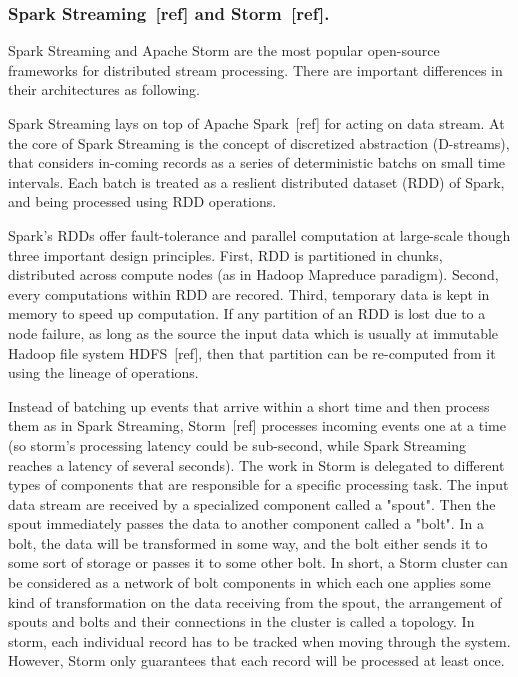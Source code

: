 \documentclass{acm_proc_article-sp}
\begin{document}
\subsubsection{Spark Streaming~[ref] and Storm~[ref].}

Spark Streaming and Apache Storm are the most popular open-source frameworks for distributed stream processing. There are important differences in their architectures as following.

Spark Streaming lays on top of Apache Spark~[ref] for acting on data stream.
 At the core of Spark Streaming is the concept of discretized abstraction (D-streams), that considers in-coming records as a series of deterministic batchs on small time intervals. Each batch is treated as a reslient distributed dataset (RDD) of Spark, and being processed using RDD operations. 

 Spark's RDDs offer fault-tolerance and parallel computation at large-scale though three important design principles. First, RDD is partitioned in chunks, distributed across compute nodes (as in Hadoop Mapreduce paradigm). Second, every computations within RDD are recored. Third, temporary data is kept in memory to speed up computation. If any partition of an RDD is lost due to a node failure, as long as the source the input data which is usually at immutable Hadoop file system HDFS~[ref], then that partition can be re-computed from it using the lineage of operations.

Instead of batching up events that arrive within a short time and then process them as in Spark Streaming, Storm~[ref] processes incoming events one at a time (so storm’s processing latency could be sub-second, while Spark Streaming reaches a latency of several seconds). The work in Storm is delegated to different types of components that are responsible for a specific processing task. The input data stream are received by a specialized component called a "spout". Then the spout immediately passes the data to another component called a "bolt". In a bolt, the data will be transformed in some way, and the bolt either sends it to some sort of storage or passes it to some other bolt. In short, a Storm cluster can be considered as a network of bolt components in which each one applies some kind of transformation on the data receiving from the spout, the arrangement of spouts and bolts and their connections in the cluster is called a topology. In storm, each individual record has to be tracked when moving through the system. However, Storm only guarantees that each record will be processed at least once.
\end{document}

